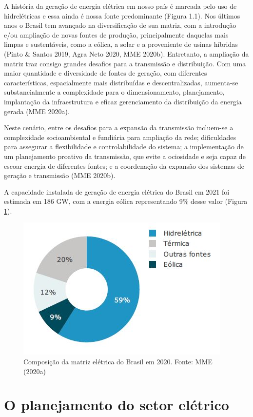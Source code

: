 \documentclass[
  oneside]{scrbook}
\begin{document}
A história da geração de energia elétrica em nosso país é marcada pelo uso de hidrelétricas e essa ainda é nossa fonte predominante (Figura 1.1). Nos últimos anos o Brasil tem avançado na diversificação de sua matriz, com a introdução e/ou ampliação de novas fontes de produção, principalmente daquelas mais limpas e sustentáveis, como a eólica, a solar e a proveniente de usinas híbridas (Pinto \& Santos 2019, Agra Neto 2020, MME 2020b). Entretanto, a ampliação da matriz traz consigo grandes desafios para a transmissão e distribuição. Com uma maior quantidade e diversidade de fontes de geração, com diferentes características, espacialmente mais distribuídas e descentralizadas, aumenta-se substancialmente a complexidade para o dimensionamento, planejamento, implantação da infraestrutura e eficaz gerenciamento da distribuição da energia gerada (MME 2020a).

Neste cenário, entre os desafios para a expansão da transmissão incluem-se a complexidade socioambiental e fundiária para ampliação da rede; dificuldades para assegurar a flexibilidade e controlabilidade do sistema; a implementação de um planejamento proativo da transmissão, que evite a ociosidade e seja capaz de escoar energia de diferentes fontes; e a coordenação da expansão dos sistemas de geração e transmissão (MME 2020b).

A capacidade instalada de geração de energia elétrica do Brasil em 2021 foi estimada em 186 GW, com a energia eólica representando 9\% desse valor (Figura \ref{fig:01}).

\begin{figure}[H]

{\centering \includegraphics[width=0.6\linewidth]{imagens/cap01/Figura_1.1} 

}

\caption{Composição da matriz elétrica do Brasil em 2020. Fonte: MME (2020a)}\label{fig:01}
\end{figure}

\hypertarget{o-planejamento-do-setor-eluxe9trico}{%
\section{O planejamento do setor elétrico}\label{o-planejamento-do-setor-eluxe9trico}}
\end{document}
